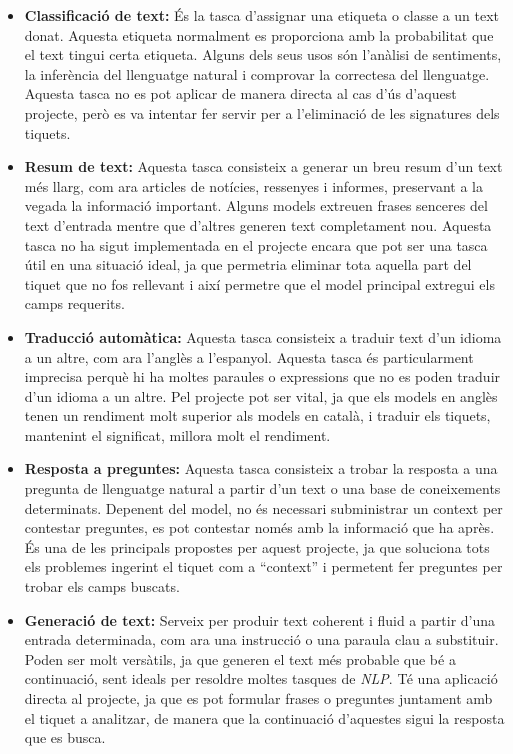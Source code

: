\begin{itemize}
    \item \textbf{Classificació de text:} És la tasca d'assignar una etiqueta o classe a un text donat. Aquesta etiqueta normalment es proporciona amb la probabilitat que el text tingui certa etiqueta. Alguns dels seus usos són l'anàlisi de sentiments, la inferència del llenguatge natural i comprovar la correctesa del llenguatge. Aquesta tasca no es pot aplicar de manera directa al cas d'ús d'aquest projecte, però es va intentar fer servir per a l'eliminació de les signatures dels tiquets.
    \item \textbf{Resum de text:} Aquesta tasca consisteix a generar un breu resum d'un text més llarg, com ara articles de notícies, ressenyes i informes, preservant a la vegada la informació important. Alguns models extreuen frases senceres del text d'entrada mentre que d'altres generen text completament nou. Aquesta tasca no ha sigut implementada en el projecte encara que pot ser una tasca útil en una situació ideal, ja que permetria eliminar tota aquella part del tiquet que no fos rellevant i així permetre que el model principal extregui els camps requerits.
    \item \textbf{Traducció automàtica:} Aquesta tasca consisteix a traduir text d'un idioma a un altre, com ara l'anglès a l'espanyol. Aquesta tasca és particularment imprecisa perquè hi ha moltes paraules o expressions que no es poden traduir d'un idioma a un altre. Pel projecte pot ser vital, ja que els models en anglès tenen un rendiment molt superior als models en català, i traduir els tiquets, mantenint el significat, millora molt el rendiment.
    \item \textbf{Resposta a preguntes:} Aquesta tasca consisteix a trobar la resposta a una pregunta de llenguatge natural a partir d'un text o una base de coneixements determinats. Depenent del model, no és necessari subministrar un context per contestar preguntes, es pot contestar només amb la informació que ha après. És una de les principals propostes per aquest projecte, ja que soluciona tots els problemes ingerint el tiquet com a ``context'' i permetent fer preguntes per trobar els camps buscats.
    \item \textbf{Generació de text:} Serveix per produir text coherent i fluid a partir d'una entrada determinada, com ara una instrucció o una paraula clau a substituir. Poden ser molt versàtils, ja que generen el text més probable que bé a continuació, sent ideals per resoldre moltes tasques de \textit{NLP}. Té una aplicació directa al projecte, ja que es pot formular frases o preguntes juntament amb el tiquet a analitzar, de manera que la continuació d'aquestes sigui la resposta que es busca.

\end{itemize}
